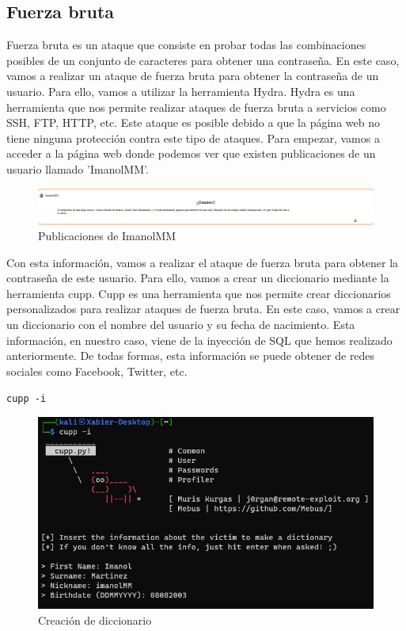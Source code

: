 \documentclass{report}
\begin{document}
            \subsection{Fuerza bruta}
                Fuerza bruta es un ataque que consiste en probar todas las combinaciones posibles de un conjunto de caracteres para obtener una contraseña.
                En este caso, vamos a realizar un ataque de fuerza bruta para obtener la contraseña de un usuario.
                Para ello, vamos a utilizar la herramienta Hydra.
                Hydra es una herramienta que nos permite realizar ataques de fuerza bruta a servicios como SSH, FTP, HTTP, etc.
                Este ataque es posible debido a que la página web no tiene ninguna protección contra este tipo de ataques.
                Para empezar, vamos a acceder a la página web donde podemos ver que existen publicaciones de un usuario llamado 'ImanolMM'.
                \begin{figure}[H]
                    \centering
                    \includegraphics[width=1\textwidth]{./img/vulnerabilidades/2.4/3.1.png}
                    \caption{Publicaciones de ImanolMM}
                \end{figure}
                Con esta información, vamos a realizar el ataque de fuerza bruta para obtener la contraseña de este usuario.
                Para ello, vamos a crear un diccionario mediante la herramienta cupp.
                Cupp es una herramienta que nos permite crear diccionarios personalizados para realizar ataques de fuerza bruta.
                En este caso, vamos a crear un diccionario con el nombre del usuario y su fecha de nacimiento.
                Esta información, en nuestro caso, viene de la inyección de SQL que hemos realizado anteriormente.
                De todas formas, esta información se puede obtener de redes sociales como Facebook, Twitter, etc.
                \begin{center}
                    \texttt{cupp -i}
                \end{center}
                \begin{figure}[H]
                    \centering
                    \includegraphics[width=1\textwidth]{./img/vulnerabilidades/2.4/3.2.png}
                    \caption{Creación de diccionario}
                \end{figure}
\end{document}
